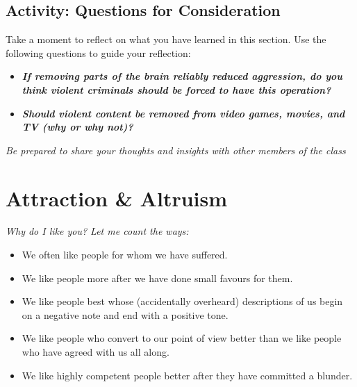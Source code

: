 \documentclass[
]{book}
\providecommand{\tightlist}{%
  \setlength{\itemsep}{0pt}\setlength{\parskip}{0pt}}
\begin{document}
\hypertarget{activity-questions-for-consideration-10}{%
\subsection*{Activity: Questions for Consideration}\label{activity-questions-for-consideration-10}}

\begin{reflect}
Take a moment to reflect on what you have learned in this section. Use the following questions to guide your reflection:

\begin{itemize}
\tightlist
\item
  \textbf{\emph{If removing parts of the brain reliably reduced aggression, do you think violent criminals should be forced to have this operation?}}
\item
  \textbf{\emph{Should violent content be removed from video games, movies, and TV (why or why not)?}}
\end{itemize}

\emph{Be prepared to share your thoughts and insights with other members of the class}
\end{reflect}

\hypertarget{attraction-altruism}{%
\section{Attraction \& Altruism}\label{attraction-altruism}}

\emph{Why do I like you? Let me count the ways:}

\begin{itemize}
\tightlist
\item
  We often like people for whom we have suffered.\\
\item
  We like people more after we have done small favours for them.\\
\item
  We like people best whose (accidentally over­heard) descriptions of us begin on a negative note and end with a posi­tive tone.\\
\item
  We like people who convert to our point of view better than we like people who have agreed with us all along.\\
\item
  We like highly competent people better after they have committed a blunder.
\end{itemize}
\end{document}
